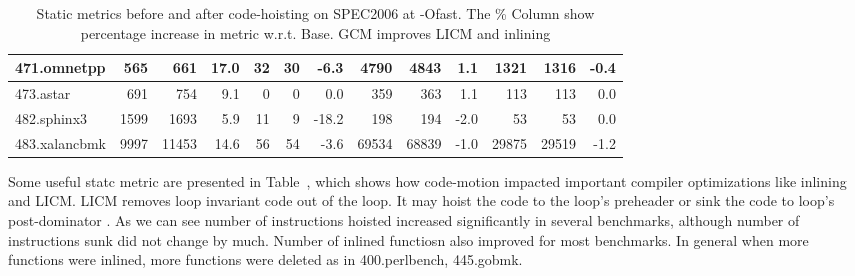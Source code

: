 \documentclass[acmlarge,review,anonymous]{acmart}\settopmatter{printfolios=true}
\begin{document}
\begin{table}[h!]
\begin{center}
\begin{tabular}{|l|r|r|r|r|r|r|r|r|r|r|r|r|}
 471.omnetpp	  & 565	        & 661	& 17.0& 32	& 30	& -6.3 & 4790	& 4843	  & 1.1 & 1321	& 1316	& -0.4 \\\hline
 473.astar	  & 691	        & 754	& 9.1 & 0	& 0	& 0.0  & 359	& 363	  & 1.1 & 113	& 113	& 0.0  \\\hline
 482.sphinx3	  & 1599	& 1693	& 5.9 & 11	& 9	& -18.2& 198	& 194	  & -2.0& 53	& 53	& 0.0  \\\hline
 483.xalancbmk	  & 9997	& 11453	& 14.6& 56	& 54	& -3.6 & 69534	& 68839	  & -1.0& 29875	& 29519	& -1.2 \\\hline
    \end{tabular}
  \end{center}
  \caption{Static metrics before and after code-hoisting on SPEC2006 at -Ofast. The \% Column show percentage increase in metric w.r.t. Base. GCM improves LICM and inlining}
  \label{tab:stats}
\end{table}

Some useful statc metric are presented in Table~\cite{tab:stats}, which shows how code-motion
impacted important compiler optimizations like inlining and LICM. LICM removes loop invariant
code out of the loop. It may hoist the code to the loop's preheader or sink the code to loop's
post-dominator \cite{steven1997advanced}. As we can see number of instructions hoisted increased
significantly in several benchmarks, although number of instructions sunk did not change by much.
Number of inlined functiosn also improved for most benchmarks. In general when more functions
were inlined, more functions were deleted as in 400.perlbench, 445.gobmk.
\end{document}
